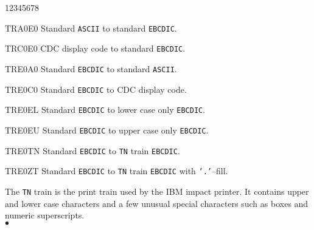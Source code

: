 \begin{DLtt}{12345678}
\item [TRA0E0] Standard {\tt ASCII} to standard {\tt EBCDIC}.
\item [TRC0E0] CDC display code to standard {\tt EBCDIC}.
\item [TRE0A0] Standard {\tt EBCDIC} to standard {\tt ASCII}.
\item [TRE0C0] Standard {\tt EBCDIC} to CDC display code.
\item [TRE0EL] Standard {\tt EBCDIC} to lower case only {\tt EBCDIC}.
\item [TRE0EU] Standard {\tt EBCDIC} to upper case only {\tt EBCDIC}.
\item [TRE0TN] Standard {\tt EBCDIC} to {\tt TN} train {\tt EBCDIC}.
\item [TRE0ZT] Standard {\tt EBCDIC} to {\tt TN} train {\tt EBCDIC}
with {\tt '.'}--fill.
\end{DLtt}
\Notes
The {\tt TN} train is the print train used by the IBM impact
printer. It contains upper and lower case characters and
a few unusual special characters such as boxes and numeric
superscripts.
\\ $\bullet$
